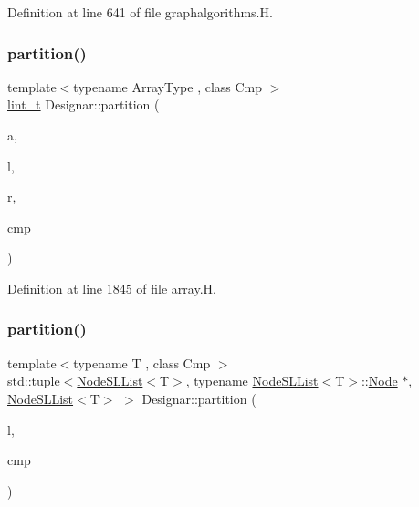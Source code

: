 Definition at line 641 of file graphalgorithms.\+H.

\mbox{\label{namespace_designar_a43b31dd9df26bd0c268d2aa653de6cf0}} 
\subsubsection{\texorpdfstring{partition()}{partition()}\hspace{0.1cm}{\footnotesize\ttfamily [1/3]}}
{\footnotesize\ttfamily template$<$typename Array\+Type , class Cmp $>$ \\
\hyperlink{namespace_designar_a9d113d66a39e82b73727c72cd3a52f73}{lint\+\_\+t} Designar\+::partition (\begin{DoxyParamCaption}\item[{Array\+Type \&}]{a,  }\item[{\hyperlink{namespace_designar_a9d113d66a39e82b73727c72cd3a52f73}{lint\+\_\+t}}]{l,  }\item[{\hyperlink{namespace_designar_a9d113d66a39e82b73727c72cd3a52f73}{lint\+\_\+t}}]{r,  }\item[{Cmp \&}]{cmp }\end{DoxyParamCaption})}



Definition at line 1845 of file array.\+H.

\mbox{\label{namespace_designar_acbe78eef938395624f248f069fcc3de0}} 
\subsubsection{\texorpdfstring{partition()}{partition()}\hspace{0.1cm}{\footnotesize\ttfamily [2/3]}}
{\footnotesize\ttfamily template$<$typename T , class Cmp $>$ \\
std\+::tuple$<$\hyperlink{class_designar_1_1_node_s_l_list}{Node\+S\+L\+List}$<$T$>$, typename \hyperlink{class_designar_1_1_node_s_l_list}{Node\+S\+L\+List}$<$T$>$\+::\hyperlink{namespace_designar_a5af326c65aa2bd26b26c410f2030d09e}{Node} $\ast$, \hyperlink{class_designar_1_1_node_s_l_list}{Node\+S\+L\+List}$<$T$>$ $>$ Designar\+::partition (\begin{DoxyParamCaption}\item[{\hyperlink{class_designar_1_1_node_s_l_list}{Node\+S\+L\+List}$<$ T $>$ \&}]{l,  }\item[{Cmp \&}]{cmp }\end{DoxyParamCaption})\hspace{0.3cm}{\ttfamily [inline]}}



